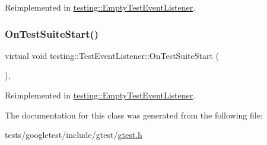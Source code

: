 Reimplemented in \hyperlink{classtesting_1_1EmptyTestEventListener_aefdb73682d290791461e186d864db718}{testing\+::\+Empty\+Test\+Event\+Listener}.

\mbox{\label{classtesting_1_1TestEventListener_a2726cc70dfda861f109355f1d9f09dfe}} 
\subsubsection{\texorpdfstring{On\+Test\+Suite\+Start()}{OnTestSuiteStart()}}
{\footnotesize\ttfamily virtual void testing\+::\+Test\+Event\+Listener\+::\+On\+Test\+Suite\+Start (\begin{DoxyParamCaption}\item[{const \hyperlink{classtesting_1_1TestSuite}{Test\+Suite} \&}]{ }\end{DoxyParamCaption})\hspace{0.3cm}{\ttfamily [inline]}, {\ttfamily [virtual]}}



Reimplemented in \hyperlink{classtesting_1_1EmptyTestEventListener_a1e32e4bd4857822b6b50e6900aa5c651}{testing\+::\+Empty\+Test\+Event\+Listener}.



The documentation for this class was generated from the following file\+:\begin{DoxyCompactItemize}
\item 
tests/googletest/include/gtest/\hyperlink{gtest_8h}{gtest.\+h}\end{DoxyCompactItemize}
